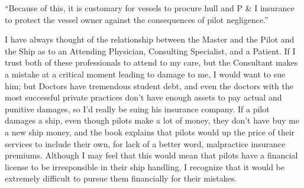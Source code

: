 
\date{Admiralty Law -- DD MON YYYY}


\begin{flushleft}
\thetitle

\thedate

\theauthor
\end{flushleft}

``Because of this, it is customary for vessels to procure hull and P \& I insurance to protect the vessel owner against the consequences of pilot negligence.''  %

I have always thought of the relationship between the Master and the Pilot and the Ship as to an Attending Physician, Consulting Specialist, and a Patient. If I trust both of these professionals to attend to my care, but the Consultant makes a mistake at a critical moment leading to damage to me, I would want to sue him; but Doctors have tremendous student debt, and even the doctors with the most successful private practices don’t have enough assets to pay actual and punitive damages, so I’d really be suing his insurance company. If a pilot damages a ship, even though pilots make a lot of money, they don’t have buy me a new ship money, and the book explains that pilots would up the price of their services to include their own, for lack of a better word, malpractice insurance premiums. Although I may feel that this would mean that pilots have a financial license to be irresponsible in their ship handling, I recognize that it would be extremely difficult to pursue them financially for their mistakes.

